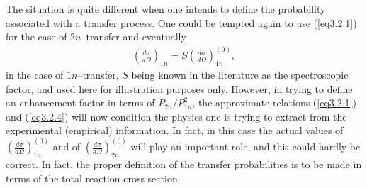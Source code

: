 The situation is  quite different when one intends to define the probability associated with a transfer process. One could be tempted again to use (\ref{eq3.2.1}) for the case of $2n$--transfer and eventually
\begin{align}\label{eq3.2.4}
\left(\frac{d\sigma}{d\Omega}\right)_{1n}=S\left(\frac{d\sigma}{d\Omega}\right)_{1n}^{(0)},
\end{align}
in the case of $1n$--transfer, $S$ being known in the literature as the spectroscopic factor, and used here for illustration purposes only. However, in trying to define an enhancement factor in terms of $P_{2n}/P_{1n}^2$, the approximate relations (\ref{eq3.2.1}) and (\ref{eq3.2.4}) will now condition the physics one is trying to extract from the experimental (empirical) information. In fact, in this case the actual values of $\left(\frac{d\sigma}{d\Omega}\right)_{1n}^{(0)}$ and of $\left(\frac{d\sigma}{d\Omega}\right)_{2n}^{(0)}$ will play an important role, and this could hardly be  correct. In fact, the proper definition of the transfer probabilities is to be made in terms of the total reaction cross section.


